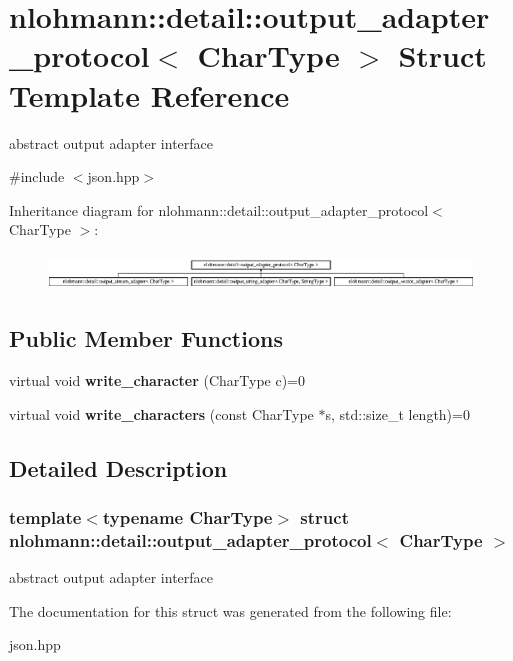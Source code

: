 \hypertarget{structnlohmann_1_1detail_1_1output__adapter__protocol}{}\section{nlohmann\+:\+:detail\+:\+:output\+\_\+adapter\+\_\+protocol$<$ Char\+Type $>$ Struct Template Reference}
\label{structnlohmann_1_1detail_1_1output__adapter__protocol}


abstract output adapter interface  




{\ttfamily \#include $<$json.\+hpp$>$}

Inheritance diagram for nlohmann\+:\+:detail\+:\+:output\+\_\+adapter\+\_\+protocol$<$ Char\+Type $>$\+:\begin{figure}[H]
\begin{center}
\leavevmode
\includegraphics[height=0.962199cm]{structnlohmann_1_1detail_1_1output__adapter__protocol}
\end{center}
\end{figure}
\subsection*{Public Member Functions}
\begin{DoxyCompactItemize}
\item 
\mbox{\label{structnlohmann_1_1detail_1_1output__adapter__protocol_a3381896fe1be557f591de2e917cdc7d5}} 
virtual void {\bfseries write\+\_\+character} (Char\+Type c)=0
\item 
\mbox{\label{structnlohmann_1_1detail_1_1output__adapter__protocol_a2f410a164e0eda17cf6561114b0eee4a}} 
virtual void {\bfseries write\+\_\+characters} (const Char\+Type $\ast$s, std\+::size\+\_\+t length)=0
\end{DoxyCompactItemize}


\subsection{Detailed Description}
\subsubsection*{template$<$typename Char\+Type$>$\newline
struct nlohmann\+::detail\+::output\+\_\+adapter\+\_\+protocol$<$ Char\+Type $>$}

abstract output adapter interface 

The documentation for this struct was generated from the following file\+:\begin{DoxyCompactItemize}
\item 
json.\+hpp\end{DoxyCompactItemize}
